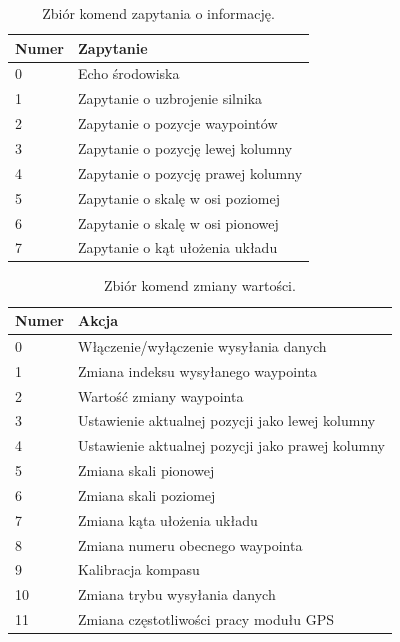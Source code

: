 \documentclass[12pt, a4paper]{article}
\begin{document}
\begin{table}[H]
\centering
\begin{tabular}{| l | l |}
\hline
\textbf{Numer} & \textbf{Zapytanie} \\
\hline
0 & Echo środowiska \\
\hline
1 & Zapytanie o uzbrojenie silnika \\
\hline
2 & Zapytanie o pozycje waypointów \\
\hline
3 & Zapytanie o pozycję lewej kolumny \\
\hline
4 & Zapytanie o pozycję prawej kolumny \\
\hline
5 & Zapytanie o skalę w osi poziomej \\
\hline
6 & Zapytanie o skalę w osi pionowej \\
\hline
7 & Zapytanie o kąt ułożenia układu \\
\hline

\end{tabular}
\caption{Zbiór komend zapytania o informację.}
\end{table}

\begin{table}[H]
\centering
\begin{tabular}{| l | l |}
\hline
\textbf{Numer} & \textbf{Akcja} \\
\hline
0 & Włączenie/wyłączenie wysyłania danych \\
\hline
1 & Zmiana indeksu wysyłanego waypointa \\
\hline
2 & Wartość zmiany waypointa \\
\hline
3 & Ustawienie aktualnej pozycji jako lewej kolumny \\
\hline
4 & Ustawienie aktualnej pozycji jako prawej kolumny \\
\hline
5 & Zmiana skali pionowej \\
\hline
6 & Zmiana skali poziomej \\
\hline
7 & Zmiana kąta ułożenia układu \\
\hline
8 & Zmiana numeru obecnego waypointa \\
\hline
9 & Kalibracja kompasu \\
\hline
10 & Zmiana trybu wysyłania danych \\
\hline
11 & Zmiana częstotliwości pracy modułu GPS \\
\hline

\end{tabular}
\caption{Zbiór komend zmiany wartości.}
\end{table}
\end{document}
